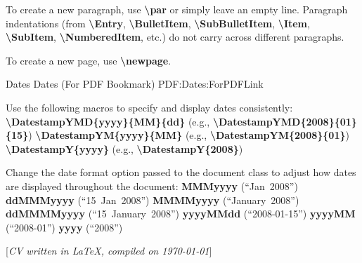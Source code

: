 \documentclass[letterpaper,MMMMyyyy,nonstopmode]{simpleresumecv}
\newcommand{\CVNote}{CV written in \LaTeX, compiled on {\today}}
\newcommand{\Code}[1]{\mbox{\textbf{#1}}}
\newcommand{\CodeCommand}[1]{\mbox{\textbf{\textbackslash{#1}}}}
\begin{document}
\begin{Body}
\Gap
\BulletItem
To create a new paragraph, use \CodeCommand{par} or simply leave an empty line.
Paragraph indentations (from
\CodeCommand{Entry},
\CodeCommand{BulletItem},
\CodeCommand{SubBulletItem},
\CodeCommand{Item},
\CodeCommand{SubItem},
\CodeCommand{NumberedItem},
etc.) do not carry across different paragraphs.

\Gap
\BulletItem
To create a new page, use \CodeCommand{newpage}.

\BigGap
\SubSection
{Dates}
{Dates (For PDF Bookmark)}
{PDF:Dates:ForPDFLink}

\Gap
\BulletItem
Use the following macros to specify and display dates consistently:
\SubBulletItem
\CodeCommand{DatestampYMD\{yyyy\}\{MM\}\{dd\}}
(e.g., \CodeCommand{DatestampYMD\{2008\}\{01\}\{15\}})
\SubBulletItem
\CodeCommand{DatestampYM\{yyyy\}\{MM\}}
(e.g., \CodeCommand{DatestampYM\{2008\}\{01\}})
\SubBulletItem
\CodeCommand{DatestampY\{yyyy\}}
(e.g., \CodeCommand{DatestampY\{2008\}})

\Gap
\BulletItem
Change the date format option passed to the document class to adjust how dates are displayed throughout the document:
\SubBulletItem
\Code{MMMyyyy} (``Jan~2008'')
\SubBulletItem
\Code{ddMMMyyyy} (``15~Jan~2008'')
\SubBulletItem
\Code{MMMMyyyy} (``January~2008'')
\SubBulletItem
\Code{ddMMMMyyyy} (``15~January~2008'')
\SubBulletItem
\Code{yyyyMMdd} (``2008-01-15'')
\SubBulletItem
\Code{yyyyMM} (``2008-01'')
\SubBulletItem
\Code{yyyy} (``2008'')

\endgroup

\fi

\end{Body}


\UseNoteFont%
\null\hfill%
[\textit{\CVNote}]
\end{document}
